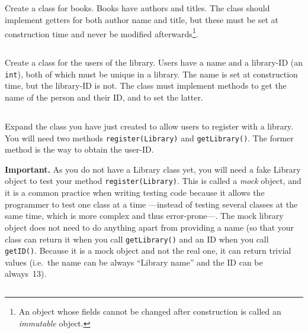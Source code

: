 \documentclass{article}
\begin{document}
\subsection{}

Create a class for books. Books have authors and titles. The class
should implement getters for both author name and title, but these
must be set at construction time and never be modified
afterwards\footnote{An object whose fields cannot be changed after
  construction is called an \emph{immutable} object.}.

\subsection{}

Create a class for the users of the library. Users have a name and a
library-ID (an \verb+int+), 
both of which must be unique in a library. The name is
set at construction time, but the library-ID is not. 
The class must implement methods to get the
name of the person and their ID, 
and to set the latter. %

\subsection{}

Expand the class you have just created to allow users to register with
a library. You will need two methods \verb+register(Library)+
and \verb+getLibrary()+. The former method is the way to obtain the
user-ID. 

\textbf{Important.} As you do not have a Library class yet, you will need a fake
Library object to test your method \verb+register(Library)+. This is called a
\emph{mock} object, and it is a common practice when writing testing
code because it allows the programmer to test one class at a time
---instead of testing several classes at the same time, which is more
complex and thus error-prone---. 
The mock library object does not need to do anything apart from
providing a name (so that your class can return it when you call
\verb+getLibrary()+ and an ID when you call \verb+getID()+. Because it
is a mock object and not the real one, it can return trivial values
(i.e.~the name can be always ``Library name'' and the ID can be
always~13).  

\subsection{}
\end{document}
